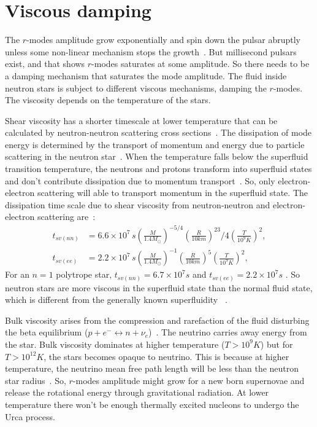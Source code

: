 \documentclass{ttuthes2007}
\begin{document}
\section{Viscous damping}
The $r$-modes amplitude grow exponentially and spin down the pulsar abruptly
unless some non-linear mechanism stops the growth~\cite{}. But millisecond
pulsars exist, and that shows $r$-modes saturates at some amplitude. So there
needs to be a damping mechanism that saturates the mode amplitude.  The fluid
inside neutron stars is subject to different viscous mechanisms, damping the
$r$-modes. The viscosity depends on the temperature of the stars.

Shear viscosity has a shorter timescale at lower temperature that can be
calculated by neutron-neutron scattering cross sections~\cite{Owen_2000}. The dissipation
of mode energy is determined by the transport of momentum and energy due to
particle scattering in the neutron star~\cite{1987ApJ...314..234C}. When
the temperature falls below the superfluid transition temperature, the neutrons
and protons
transform into superfluid states and don't contribute dissipation due to
momentum transport~\cite{1987ApJ...314..234C}. So, only electron-electron
scattering will able to transport momentum in the  superfluid state. The
dissipation time scale due to shear viscosity from neutron-neutron and
electron-electron scattering are~\cite{ANDERSSON_2001}:
\begin{align*}
t_{sv(nn)}&=6.6\times10^7
\,s\left(\frac{M}{1.4M_\odot}\right)^{-5/4}\left(\frac{R}{10km}\right)^23/4\left(\frac{T}{10^9K}\right)^2,\\
t_{sv(ee)}&=2.2\times10^7\,s\left(\frac{M}{1.4M_\odot}\right)^{-1}\left(\frac{R}{10km}\right)^5\left(\frac{T}{10^9K}\right)^2,
\end{align*}
For an $n=1$ polytrope star, $t_{sv(nn)}=6.7\times 10^7 s$ and
$t_{sv(ee)}=2.2\times 10^7 s$ . So neutron stars are more viscous in the superfluid
state than the normal fluid state, which is different from the generally known superfluidity
~\cite{1987ApJ...314..234C}.

Bulk viscosity arises from the compression and rarefaction of the fluid
disturbing the beta equilibrium ($p+e^- \leftrightarrow n +
\nu_e$)~\cite{Owen_2000}. The neutrino carries away energy from the star.
Bulk viscosity dominates at higher temperature ($T>10^9 K$) but for $T > 10^{12}
K$, the stars becomes opaque to neutrino. This is because at higher temperature,
the neutrino mean free path length will be less  than the neutron star
radius~\cite{page2013stellar}. So, $r$-modes amplitude might grow
for a new born supernovae and release the rotational energy through
gravitational radiation. At lower temperature there won't be enough thermally
excited nucleons to undergo the Urca process.
\end{document}
